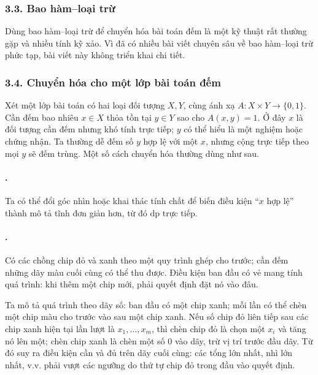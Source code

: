 \documentclass[11pt]{article}
\begin{document}
\subsubsection*{3.3. Bao hàm--loại trừ}

Dùng bao hàm--loại trừ để chuyển hóa bài toán đếm là một kỹ thuật rất thường
gặp và nhiều tính kỹ xảo. Vì đã có nhiều bài viết chuyên sâu về bao hàm--loại
trừ phức tạp, bài viết này không triển khai chi tiết.

\subsubsection*{3.4. Chuyển hóa cho một lớp bài toán đếm}

Xét một lớp bài toán có hai loại đối tượng \(X,Y\), cùng ánh xạ
\(A:X\times Y\to\{0,1\}\). Cần đếm bao nhiêu \(x\in X\) thỏa tồn tại
\(y\in Y\) sao cho \(A(x,y)=1\). Ở đây \(x\) là đối tượng cần đếm nhưng khó
tính trực tiếp; \(y\) có thể hiểu là một nghiệm hoặc chứng nhận. Ta thường dễ
đếm số \(y\) hợp lệ với một \(x\), nhưng cộng trực tiếp theo mọi \(y\) sẽ đếm
trùng. Một số cách chuyển hóa thường dùng như sau.

\paragraph{.}

Ta có thể đổi góc nhìn hoặc khai thác tính chất để biến điều kiện ``\(x\) hợp
lệ'' thành mô tả tĩnh đơn giản hơn, từ đó \(\mathrm{dp}\) trực tiếp.

\paragraph{.}
Có các chồng chip đỏ và xanh theo một quy trình ghép cho trước; cần đếm những
dãy màu cuối cùng có thể thu được. Điều kiện ban đầu có vẻ mang tính quá trình:
khi thêm một chip mới, phải quyết định đặt nó vào đâu.

Ta mô tả quá trình theo dãy số: ban đầu có một chip xanh; mỗi lần có thể chèn
một chip màu cho trước vào sau một chip xanh. Nếu số chip đỏ liên tiếp sau các
chip xanh hiện tại lần lượt là \(x_1,\ldots,x_m\), thì chèn chip đỏ là chọn một
\(x_i\) và tăng nó lên một; chèn chip xanh là chèn một số \(0\) vào dãy, trừ vị
trí trước đầu dãy. Từ đó suy ra điều kiện cần và đủ trên dãy cuối cùng: các
tổng lớn nhất, nhì lớn nhất, v.v. phải vượt các ngưỡng do thứ tự chip đỏ trong
đầu vào quyết định.
\end{document}
